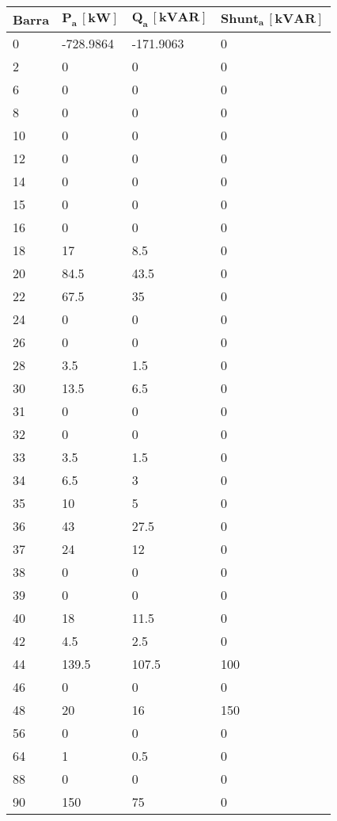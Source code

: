 \begin{tabular}{llll}
\toprule
\textbf{Barra}&\textbf{$\mathbf{P_a\,[kW]}$}&\textbf{$\mathbf{Q_a\,[kVAR]}$}&\textbf{$\mathbf{Shunt_a\,[kVAR]}$}\\
\midrule
0&-728.9864&-171.9063&0\\
2&0&0&0\\
6&0&0&0\\
8&0&0&0\\
10&0&0&0\\
12&0&0&0\\
14&0&0&0\\
15&0&0&0\\
16&0&0&0\\
18&17&8.5&0\\
20&84.5&43.5&0\\
22&67.5&35&0\\
24&0&0&0\\
26&0&0&0\\
28&3.5&1.5&0\\
30&13.5&6.5&0\\
31&0&0&0\\
32&0&0&0\\
33&3.5&1.5&0\\
34&6.5&3&0\\
35&10&5&0\\
36&43&27.5&0\\
37&24&12&0\\
38&0&0&0\\
39&0&0&0\\
40&18&11.5&0\\
42&4.5&2.5&0\\
44&139.5&107.5&100\\
46&0&0&0\\
48&20&16&150\\
56&0&0&0\\
64&1&0.5&0\\
88&0&0&0\\
90&150&75&0\\
\bottomrule
\end{tabular}
